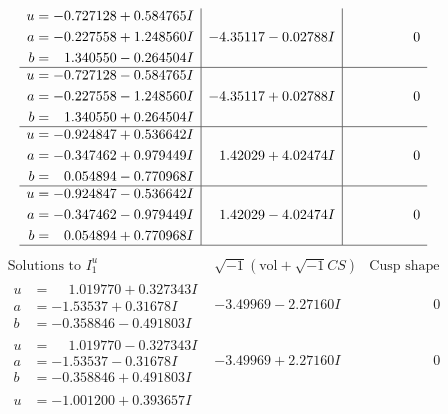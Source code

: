\documentclass[1p]{elsarticle_modified}
\theoremstyle{definition}
\newcommand{\I}{\sqrt{-1}}
\begin{document}
$$\begin{array}{c|c|c}
\begin{aligned}
u &= -0.727128 + 0.584765 I \\
a &= -0.227558 + 1.248560 I \\
b &= \phantom{-}1.340550 - 0.264504 I\end{aligned}
 & -4.35117 - 0.02788 I & \phantom{-0.000000 } 0 \\ \hline\begin{aligned}
u &= -0.727128 - 0.584765 I \\
a &= -0.227558 - 1.248560 I \\
b &= \phantom{-}1.340550 + 0.264504 I\end{aligned}
 & -4.35117 + 0.02788 I & \phantom{-0.000000 } 0 \\ \hline\begin{aligned}
u &= -0.924847 + 0.536642 I \\
a &= -0.347462 + 0.979449 I \\
b &= \phantom{-}0.054894 - 0.770968 I\end{aligned}
 & \phantom{-}1.42029 + 4.02474 I & \phantom{-0.000000 } 0 \\ \hline\begin{aligned}
u &= -0.924847 - 0.536642 I \\
a &= -0.347462 - 0.979449 I \\
b &= \phantom{-}0.054894 + 0.770968 I\end{aligned}
 & \phantom{-}1.42029 - 4.02474 I & \phantom{-0.000000 } 0\\
 \hline 
 \end{array}$$\newpage$$\begin{array}{c|c|c}  
\text{Solutions to }I^u_{1}& \I (\text{vol} + \sqrt{-1}CS) & \text{Cusp shape}\\
 \hline 
\begin{aligned}
u &= \phantom{-}1.019770 + 0.327343 I \\
a &= -1.53537 + 0.31678 I \\
b &= -0.358846 - 0.491803 I\end{aligned}
 & -3.49969 - 2.27160 I & \phantom{-0.000000 } 0 \\ \hline\begin{aligned}
u &= \phantom{-}1.019770 - 0.327343 I \\
a &= -1.53537 - 0.31678 I \\
b &= -0.358846 + 0.491803 I\end{aligned}
 & -3.49969 + 2.27160 I & \phantom{-0.000000 } 0 \\ \hline\begin{aligned}
u &= -1.001200 + 0.393657 I \\

\end{aligned}
\end{array}$$
\end{document}
